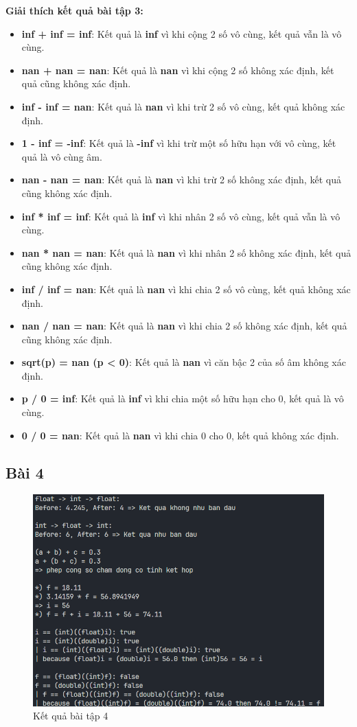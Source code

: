 \documentclass[a4paper,12pt]{report}
\begin{document}
\begin{flushleft}
	\textbf{Giải thích kết quả bài tập 3:}
	\begin{itemize}
		\item \textbf{inf + inf = inf}: Kết quả là \textbf{inf} vì khi cộng 2 số vô cùng, kết quả vẫn là vô cùng.
		\item \textbf{nan + nan = nan}: Kết quả là \textbf{nan} vì khi cộng 2 số không xác định, kết quả cũng không xác định.
		\item \textbf{inf - inf = nan}: Kết quả là \textbf{nan} vì khi trừ 2 số vô cùng, kết quả không xác định.
		\item \textbf{1 - inf = -inf}: Kết quả là \textbf{-inf} vì khi trừ một số hữu hạn với vô cùng, kết quả là vô cùng âm.
		\item \textbf{nan - nan = nan}: Kết quả là \textbf{nan} vì khi trừ 2 số không xác định, kết quả cũng không xác định.
		\item \textbf{inf * inf = inf}: Kết quả là \textbf{inf} vì khi nhân 2 số vô cùng, kết quả vẫn là vô cùng.
		\item \textbf{nan * nan = nan}: Kết quả là \textbf{nan} vì khi nhân 2 số không xác định, kết quả cũng không xác định.
		\item \textbf{inf / inf = nan}: Kết quả là \textbf{nan} vì khi chia 2 số vô cùng, kết quả không xác định.
		\item \textbf{nan / nan = nan}: Kết quả là \textbf{nan} vì khi chia 2 số không xác định, kết quả cũng không xác định.
		\item \textbf{sqrt(p) = nan (p < 0)}: Kết quả là \textbf{nan} vì căn bậc 2 của số âm không xác định.
		\item \textbf{p / 0 = inf}: Kết quả là \textbf{inf} vì khi chia một số hữu hạn cho 0, kết quả là vô cùng.
		\item \textbf{0 / 0 = nan}: Kết quả là \textbf{nan} vì khi chia 0 cho 0, kết quả không xác định.
	\end{itemize}
\end{flushleft}

\subsection{Bài 4}
\begin{figure}[!ht]
	\centering
	\includegraphics[width=0.7\linewidth]{imgs/4.png}
	\caption{Kết quả bài tập 4}
\end{figure}
\end{document}

